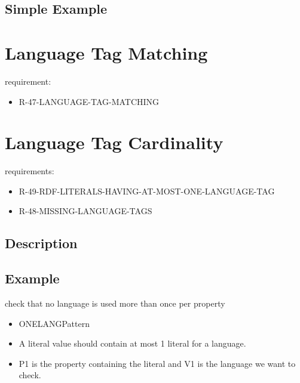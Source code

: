 \documentclass{llncs}
\begin{document}
\subsection{Simple Example}

\section{Language Tag Matching}

requirement:

\begin{itemize}
	\item R-47-LANGUAGE-TAG-MATCHING
\end{itemize}

\section{Language Tag Cardinality}

requirements:

\begin{itemize}
	\item R-49-RDF-LITERALS-HAVING-AT-MOST-ONE-LANGUAGE-TAG
	\item R-48-MISSING-LANGUAGE-TAGS
\end{itemize}
 
\subsection{Description}

\subsection{Example}

check that no language is used more than once per property


\begin{itemize}
	\item ONELANGPattern \cite{Kontokostas2014} 
  \item A literal value should contain at most 1 literal for a language. 
  \item P1 is the property containing the literal and V1 is the language we want to check.
\end{itemize}
\end{document}
